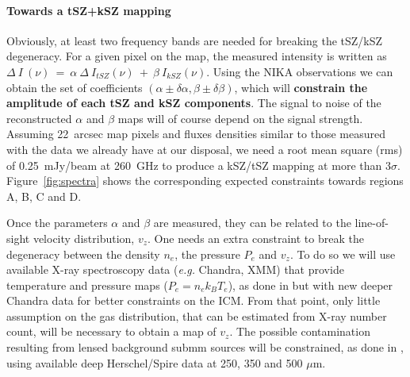 \documentclass[11pt,a4paper,twoside,graphicx,color]{article}
\begin{document}
\paragraph{\large Towards a tSZ+kSZ mapping}
Obviously, at least two frequency bands are needed for breaking the tSZ/kSZ degeneracy. For a given pixel on the map, the measured intensity is written as $\Delta~I~(\nu)~=~\alpha~\Delta~I_{tSZ}(\nu)~+~\beta~I_{kSZ}(\nu)$. Using the NIKA observations we can obtain the set of coefficients $\left(\alpha \pm \delta \alpha, \beta \pm \delta \beta\right)$, which will {\bf constrain the amplitude of each tSZ and kSZ components}. The signal to noise of the reconstructed $\alpha$ and $\beta$ maps will of course depend on the signal strength. Assuming 22~arcsec map pixels and fluxes densities similar to those measured with the data we already have at our disposal, we need a root mean square (rms) of 0.25~mJy/beam at 260~GHz to produce a kSZ/tSZ mapping at more than 3$\sigma$. Figure~\ref{fig:spectra} shows the corresponding expected constraints towards regions A, B, C and D.

Once the parameters $\alpha$ and $\beta$ are measured, they can be related to the line-of-sight velocity distribution, $v_z$. One needs an extra constraint to break the degeneracy between the density $n_e$, the pressure $P_e$ and $v_z$. To do so we will use available \mbox{X-ray} spectroscopy data ({\it e.g.} Chandra, XMM) that provide temperature and pressure maps ($P_e = n_e k_B T_e$), as done in \cite{mroczkowski2012} but with new deeper Chandra data for better constraints on the ICM. From that point, only little assumption on the gas distribution, that can be estimated from \mbox{X-ray} number count, will be necessary to obtain a map of $v_z$. The possible contamination resulting from lensed background submm sources will be constrained, as done in \cite{sayers2013}, using available deep Herschel/Spire data at 250, 350 and 500 $\mu$m.

\end{document}
